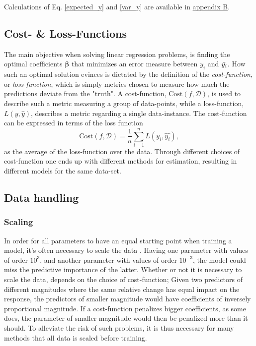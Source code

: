 Calculations of Eq. \ref{expected_y} and \ref{var_y} are available in \hyperref[appendixB]{appendix B}.

\subsection{Cost- \& Loss-Functions}
The main objective when solving linear regression problems, is finding the optimal coefficients $\boldsymbol{\beta}$ that minimizes an error measure between $y_i$ and $\Tilde{y_i}$. 
How such an optimal solution evinces is dictated by the definition of the \textit{cost-function},  or \textit{loss-function}, which is simply metrics chosen to measure how much the predictions deviate from the "truth". 
A cost-function, $\text{Cost}(f,\mathcal{D} )$, is used to describe such a metric measuring a group of data-points, while a loss-function, $L(y, \hat{y})$, describes a metric regarding a single data-instance. 
The cost-function can be expressed in terms of the loss function
\begin{equation}
\text{Cost}(f,\mathcal{D}) = \frac{1}{n}\sum_{i=1}^n L(y_i, \hat{y_i}),
\end{equation}
as the average of the loss-function over the data. 
Through different choices of cost-function one ends up with different methods for estimation, resulting in different models for the same data-set. 




\subsection{Data handling}

\subsubsection{Scaling}\label{scaling}

In order for all parameters to have an equal starting point when training a model, it's often necessary to scale the data \citep[p. 398]{hastie}. Having one parameter with values of order $10^3$, and another parameter with values of order $10^{-3}$, the model could miss the predictive importance of the latter. Whether or not it is necessary to scale the data, depends on the choice of cost-function; Given two predictors of different magnitudes where the same relative change has equal impact on the response, the predictors of smaller magnitude would have coefficients of inversely proportional magnitude. If a cost-function penalizes bigger coefficients, as some does, the parameter of smaller magnitude would then be penalized more than it should. To alleviate the risk of such problems, it is thus necessary for many methods that all data is scaled before training. 

